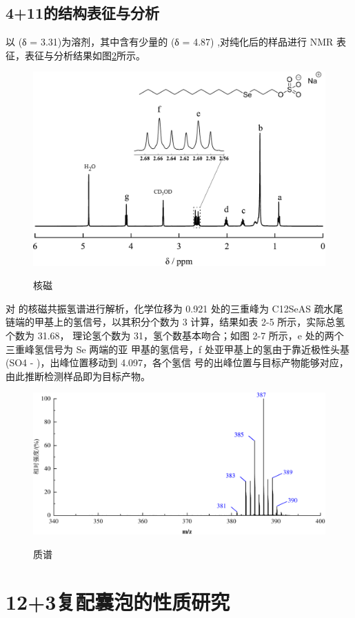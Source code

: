 \documentclass[bachelor,fandolfonts,replaceperiod]{jnuthesis} %
\begin{document}
    \subsection{4+11的结构表征与分析}
        以 (δ = 3.31)为溶剂，其中含有少量的 (δ = 4.87)\cite{babij2016nmr} ,对纯化后的样品进行
     NMR 表征，表征与分析结果如图\ref{fig:NMR-12+3}所示。
    \begin{figure}[htbp]
        \centering
        \includegraphics[width=.75\textwidth]{figure/nmr123.pdf}\\
        \caption{核磁}\label{fig:NMR-12+3}
    \end{figure}
    
    对  的核磁共振氢谱进行解析，化学位移为 0.921 处的三重峰为 C12SeAS 疏水尾
    链端的甲基上的氢信号，以其积分个数为 3 计算，结果如表 2-5 所示，实际总氢个数为 31.68，
    理论氢个数为 31，氢个数基本吻合；如图 2-7 所示，e 处的两个三重峰氢信号为 Se 两端的亚
    甲基的氢信号，f 处亚甲基上的氢由于靠近极性头基(SO4 - )，出峰位置移动到 4.097，各个氢信
    号的出峰位置与目标产物能够对应，由此推断检测样品即为目标产物。
    \begin{figure}[htbp]
        \centering
        \includegraphics[width=.8\textwidth]{figure/mass123.pdf}\\
        \caption{质谱}\label{fig:NMR-12+3}
    \end{figure}
    \section{12+3复配囊泡的性质研究}
\end{document}
